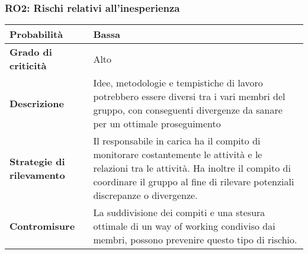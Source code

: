 \noindent\begin{minipage}{\textwidth}
\subsubsection{RO2: Rischi relativi all'inesperienza}
    
\bgroup
\begin{adjustwidth}{-0.5cm}{-0.5cm}
    \begin{longtable}{P{4.5cm}|>{\justifying \arraybackslash}P{9cm}}

        \textbf{Probabilità} & Bassa \\
        \hline
        \textbf{Grado di criticità} & Alto \\
        \hline
        \textbf{Descrizione} & Idee, metodologie e tempistiche di lavoro potrebbero essere diversi tra i vari membri del gruppo, con conseguenti divergenze da sanare per un ottimale proseguimento \\
        \hline
        \textbf{Strategie di rilevamento} &  Il responsabile in carica ha il compito di monitorare costantemente le attività e le relazioni tra le attività. Ha inoltre il compito di coordinare il gruppo al fine di rilevare potenziali discrepanze o divergenze. \\
        \hline
        \textbf{Contromisure} & La suddivisione dei compiti e una stesura ottimale di un way of working condiviso dai membri, possono prevenire questo tipo di rischio.
    \end{longtable}
\end{adjustwidth}
\egroup
\end{minipage}